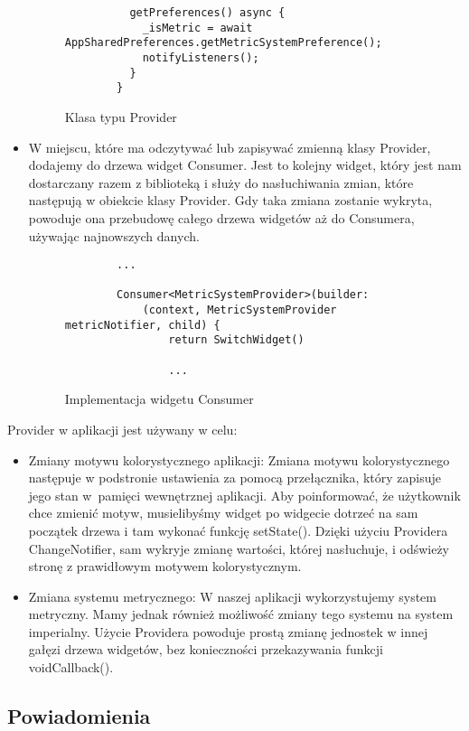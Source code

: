 \documentclass[a4paper,twoside,12pt]{book}
\begin{document}
\begin{itemize}
\begin{figure}[H]
\begin{lstlisting}
          getPreferences() async {
            _isMetric = await AppSharedPreferences.getMetricSystemPreference();
            notifyListeners();
          }
        }
        \end{lstlisting}
    \caption{Klasa typu Provider}
    \label{fig:pseudokod:listings}
    \end{figure}
    \item W miejscu, które ma odczytywać lub zapisywać zmienną klasy Provider, dodajemy do drzewa widget Consumer. Jest to kolejny widget, który jest nam dostarczany razem z biblioteką i służy do nasłuchiwania zmian, które następują w obiekcie klasy Provider. Gdy taka zmiana zostanie wykryta, powoduje ona przebudowę całego drzewa widgetów aż do Consumera, używając najnowszych danych.
    \begin{figure}[H]
        \begin{lstlisting}
        ...
        
        Consumer<MetricSystemProvider>(builder:
            (context, MetricSystemProvider metricNotifier, child) {
                return SwitchWidget()

                ...
        \end{lstlisting}
    \caption{Implementacja widgetu Consumer}
    \label{fig:pseudokod:listings}
    \end{figure}
\end{itemize}

Provider w aplikacji jest używany w celu:
\begin{itemize}
    \item Zmiany motywu kolorystycznego aplikacji: Zmiana motywu kolorystycznego następuje w podstronie ustawienia za pomocą przełącznika, który zapisuje jego stan w~pamięci wewnętrznej aplikacji. Aby poinformować, że użytkownik chce zmienić motyw, musielibyśmy widget po widgecie dotrzeć na sam początek drzewa i tam wykonać funkcję setState(). Dzięki użyciu Providera ChangeNotifier, sam wykryje zmianę wartości, której nasłuchuje, i odświeży stronę z prawidłowym motywem kolorystycznym. 
    \item Zmiana systemu metrycznego: W naszej aplikacji wykorzystujemy system metryczny. Mamy jednak również możliwość zmiany tego systemu na system imperialny. Użycie Providera powoduje prostą zmianę jednostek w innej gałęzi drzewa widgetów, bez konieczności przekazywania funkcji voidCallback().
\end{itemize}

\subsection{Powiadomienia}
\end{document}

